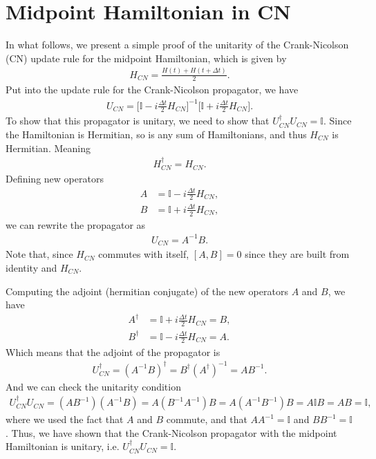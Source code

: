 \documentclass{subfiles}
\begin{document}
\section{Midpoint Hamiltonian in CN}\label{app:appendix_B}
In what follows, we present a simple proof of the unitarity of the Crank-Nicolson (CN) update rule for the midpoint Hamiltonian, which is given by
\begin{align*}
    H_{CN} = \frac{H(t) + H(t+\Delta t)}{2}.
\end{align*}
Put into the update rule for the Crank-Nicolson propagator, we have
\begin{align*}
    U_{CN} = \bigg[\mathbb{I} - i \frac{\Delta t}{2} H_{CN}\bigg]^{-1} \bigg[\mathbb{I} + i \frac{\Delta t}{2} H_{CN}\bigg].
\end{align*}
To show that this propagator is unitary, we need to show that $U_{CN}^\dagger U_{CN}  = \mathbb{I}$. Since the Hamiltonian is Hermitian, so is any sum of Hamiltonians, and thus $H_{CN}$ is Hermitian. Meaning
\begin{align*}
    H_{CN}^\dagger = H_{CN}.
\end{align*}
Defining new operators
\begin{align*}
    A &= \mathbb{I} - i \frac{\Delta t}{2} H_{CN}, \\
    B &= \mathbb{I} + i \frac{\Delta t}{2} H_{CN},
\end{align*}
we can rewrite the propagator as
\begin{align*}
    U_{CN} = A^{-1} B.
\end{align*}
Note that, since $H_{CN}$ commutes with itself, $[A, B] = 0$ since they are built from identity and $H_{CN}$. 

Computing the adjoint (hermitian conjugate) of the new operators $A$ and $B$, we have
\begin{align*}
    A^\dagger &= \mathbb{I} + i \frac{\Delta t}{2} H_{CN} = B, \\
    B^\dagger &= \mathbb{I} - i \frac{\Delta t}{2} H_{CN} = A.
\end{align*}
Which means that the adjoint of the propagator is
\begin{align*}
    U_{CN}^\dagger = (A^{-1} B)^\dagger = B^\dagger (A^\dagger)^{-1} = A B^{-1}. 
\end{align*}
And we can check the unitarity condition
\begin{align*}
    U_{CN}^\dagger U_{CN}  = (AB^{-1}) (A^{-1} B) = A(B^{-1}A^{-1})B  = A(A^{-1}B^{-1})B = A\mathbb{I}B = AB = \mathbb{I},
\end{align*}
where we used the fact that $A$ and $B$ commute, and that $A A^{-1} = \mathbb{I}$ and $B B^{-1} = \mathbb{I}$. Thus, we have shown that the Crank-Nicolson propagator with the midpoint Hamiltonian is unitary, i.e. $U_{CN}^\dagger U_{CN}  = \mathbb{I}$.
\end{document}
